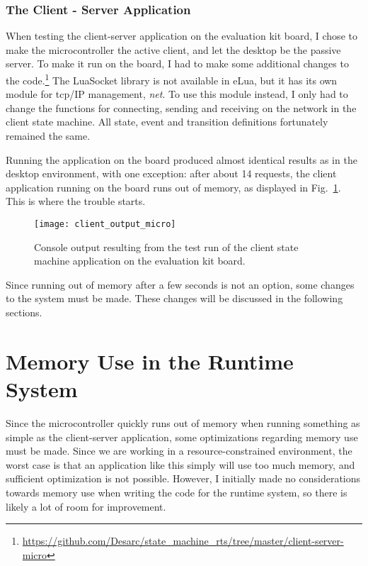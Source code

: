 \subsubsection{The Client - Server Application}
When testing the client-server application on the evaluation kit board, I chose to make the microcontroller the active client, and let the desktop be the passive server. To make it run on the board, I had to make some additional changes to the code.\footnote{\url{https://github.com/Desarc/state_machine_rts/tree/master/client-server-micro}} The LuaSocket library is not available in eLua, but it has its own module for \gls{tcp}/IP management, \emph{net}. To use this module instead, I only had to change the functions for connecting, sending and receiving on the network in the client state machine. All state, event and transition definitions fortunately remained the same.

\noindent
Running the application on the board produced almost identical results as in the desktop environment, with one exception: after about 14 requests, the client application running on the board runs out of memory, as displayed in Fig.~\ref{fig:client_output_micro}. This is where the trouble starts.

\begin{figure}[htp]
	\centering
	\texttt{[image: client\_output\_micro]}
	\caption[Output of client-server test run (microcontroller)]{Console output resulting from the test run of the client state machine application on the evaluation kit board.}
	\label{fig:client_output_micro}
\end{figure}

\noindent
Since running out of memory after a few seconds is not an option, some changes to the system must be made. These changes will be discussed in the following sections.

\section{Memory Use in the Runtime System}
\label{sec:memory_use}
Since the microcontroller quickly runs out of memory when running something as simple as the client-server application, some optimizations regarding memory use must be made. Since we are working in a resource-constrained environment, the worst case is that an application like this simply will use too much memory, and sufficient optimization is not possible. However, I initially made no considerations towards memory use when writing the code for the runtime system, so there is likely a lot of room for improvement.


